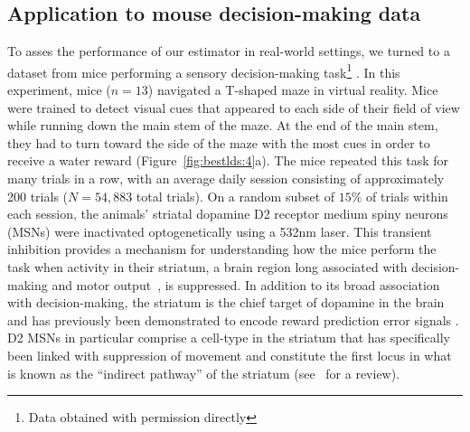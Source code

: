 \subsection{Application to mouse decision-making data}
\label{sec:bestlds:results:4.3}

To asses the performance of our estimator in real-world settings, we turned to a dataset from mice performing a sensory decision-making task\footnote{Data obtained with permission directly} \cite{bolkan_opponent_2022}. In this experiment, mice ($n=13$) navigated a T-shaped maze in virtual reality. Mice were trained to detect visual cues that appeared to each side of their field of view while running down the main stem of the maze. At the end of the main stem, they had to turn toward the side of the maze with the most cues in order to receive a water reward (Figure~\ref{fig:bestlds:4}a). The mice repeated this task for many trials in a row, with an average daily session consisting of approximately 200 trials ($N=54,883$ total trials). On a random subset of $15\%$ of trials within each session, the animals' striatal dopamine D2 receptor medium spiny neurons (MSNs) were inactivated optogenetically using a 532nm laser. This transient inhibition provides a mechanism for understanding how the mice perform the task when activity in their striatum, a brain region long associated with decision-making and motor output~\cite{cox_striatal_2019, tang_differential_2022}, is suppressed. In addition to its broad association with decision-making, the striatum is the chief target of dopamine in the brain and has previously been demonstrated to encode reward prediction error signals \cite{schultz_activity_1994}. D2 MSNs in particular comprise a cell-type in the striatum that has specifically been linked with suppression of movement and constitute the first locus in what is known as the ``indirect pathway'' of the striatum (see~\cite{cox_striatal_2019} for a review).

